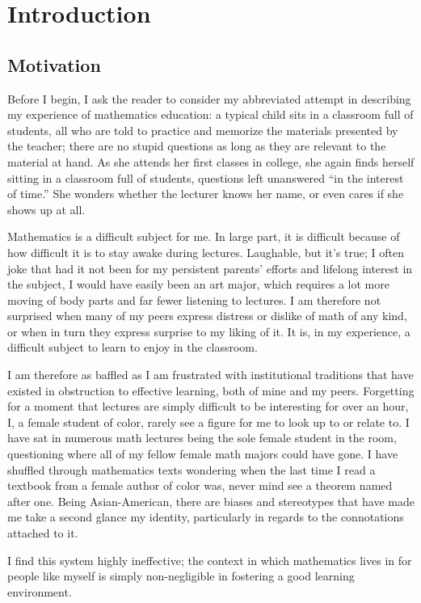 \chapter{Introduction}
\section{Motivation}

Before I begin, I ask the reader to consider my abbreviated attempt in describing my experience of mathematics education: a typical child sits in a classroom full of students, all who are told to practice and memorize the materials presented by the teacher; there are no stupid questions as long as they are relevant to the material at hand. As she attends her first classes in college, she again finds herself sitting in a classroom full of students, questions left unanswered ``in the interest of time.'' She wonders whether the lecturer knows her name, or even cares if she shows up at all.

Mathematics is a difficult subject for me. In large part, it is difficult because of how difficult it is to stay awake during lectures. Laughable, but it's true; I often joke that had it not been for my persistent parents' efforts and lifelong interest in the subject, I would have easily been an art major, which requires a lot more moving of body parts and far fewer listening to lectures. I am therefore not surprised when many of my peers express distress or dislike of math of any kind, or when in turn they express surprise to my liking of it. It is, in my experience, a difficult subject to learn to enjoy in the classroom.

I am therefore as baffled as I am frustrated with institutional traditions that have existed in obstruction to effective learning, both of mine and my peers. Forgetting for a moment that lectures are simply difficult to be interesting for over an hour, I, a female student of color, rarely see a figure for me to look up to or relate to. I have sat in numerous math lectures being the sole female student in the room, questioning where all of my fellow female math majors could have gone. I have shuffled through mathematics texts wondering when the last time I read a textbook from a female author of color was, never mind see a theorem named after one. Being Asian-American, there are biases and stereotypes that have made me take a second glance my identity, particularly in regards to the connotations attached to it.

I find this system highly ineffective; the context in which mathematics lives in for people like myself is simply non-negligible in fostering a good learning environment.

